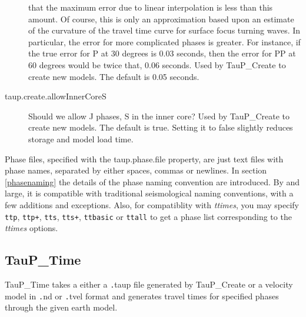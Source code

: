 \begin{description}
that the maximum error due to linear interpolation is less than this amount.
Of course, this is only an approximation based upon an estimate of the
 curvature of the travel time curve for surface focus turning waves.
In particular, the error for more complicated phases is greater. For instance,
if the true error for P at 30 degrees is 0.03 seconds, then the error for
PP at 60 degrees would be twice that, 0.06 seconds.
Used by TauP\_Create to create new models. The default is 0.05 seconds.
\item[taup.create.allowInnerCoreS] Should we allow J phases, S in
the inner core?
Used by TauP\_Create to create new models.
 The default is true. Setting it to false slightly reduces storage and model
load time.
\end{description}

Phase files, specified with the taup.phase.file property,
 are just text files with phase names, separated by either
spaces, commas or newlines. In section \ref{phasenaming} the details of
the phase naming convention are introduced.
By and large, it is compatible with traditional
seismological naming conventions, with a few additions and exceptions.
Also, for compatiblity with \textit{ttimes}, you may specify
\texttt{ttp}, \texttt{ttp+}, \texttt{tts}, \texttt{tts+},
\texttt{ttbasic} or \texttt{ttall} to get a phase list corresponding
to the \textit{ttimes} options.

\subsection{TauP\_Time}
TauP\_Time takes a either a {\texttt .taup} file generated by TauP\_Create or a velocity model in
{\texttt .nd} or {\texttt .tvel} format and generates
travel times for specified phases through the given earth model.

